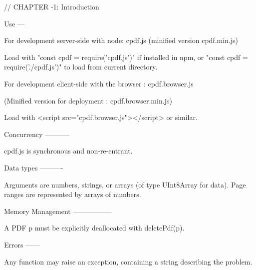 // CHAPTER -1: Introduction

Use
---

For development server-side with node: cpdf.js (minified version cpdf.min.js)

Load with "const cpdf = require('cpdf.js')" if installed in npm, or "const cpdf
= require('./cpdf.js')" to load from current directory.

For development client-side with the browser : cpdf.browser.js

(Minified version for deployment : cpdf.browser.min.js)

Load with <script src="cpdf.browser.js"></script> or similar.


Concurrency
-----------

cpdf.js is synchronous and non-re-entrant.


Data types
----------

Arguments are numbers, strings, or arrays (of type UInt8Array for data). Page
ranges are represented by arrays of numbers.


Memory Management
-----------------

A PDF p must be explicitly deallocated with deletePdf(p).


Errors
------

Any function may raise an exception, containing a string describing the problem. 


